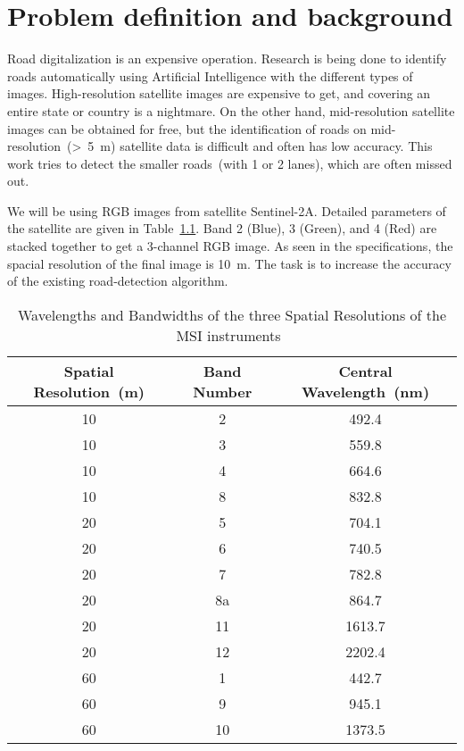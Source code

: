 \chapter{Problem definition and background}\label{chapt:problem}
Road digitalization is an expensive operation. Research is being done to identify roads automatically using Artificial Intelligence with the different types of images. High-resolution satellite images are expensive to get, and covering an entire state or country is a nightmare. On the other hand, mid-resolution satellite images can be obtained for free, but the identification of roads on mid-resolution~(>~5~m) satellite data is difficult and often has low accuracy. This work tries to detect the smaller roads~(with 1 or 2 lanes), which are often missed out.

We will be using RGB images from satellite Sentinel-2A. Detailed parameters of the satellite are given in Table~\ref{tab:sentinel-resolution}. Band 2 (Blue), 3 (Green), and 4 (Red) are stacked together to get a 3-channel RGB image. As seen in the specifications, the spacial resolution of the final image is 10~m. The task is to increase the accuracy of the existing road-detection algorithm.

\begin{table}[h!]
  \centering
  \begin{tabular}{ |c|c|c| }
    \hline
    Spatial Resolution~(m) & Band Number & Central Wavelength~(nm) \\
    \hline
    10&2&492.4 \\
    10&3&559.8 \\
    10&4&664.6 \\
    10&8&832.8 \\
    20&5&704.1 \\
    20&6&740.5 \\
    20&7&782.8 \\
    20&8a&864.7 \\
    20&11&1613.7 \\
    20&12&2202.4 \\
    60&1&442.7 \\
    60&9&945.1 \\
    60&10&1373.5 \\
    \hline
  \end{tabular}
  \caption[Wavelengths and Bandwidths of the three Spatial Resolutions of the MSI instruments]{Wavelengths and Bandwidths of the three Spatial Resolutions of the MSI instruments~\cite{sentinelSpecifications}}
  \label{tab:sentinel-resolution}
\end{table}

